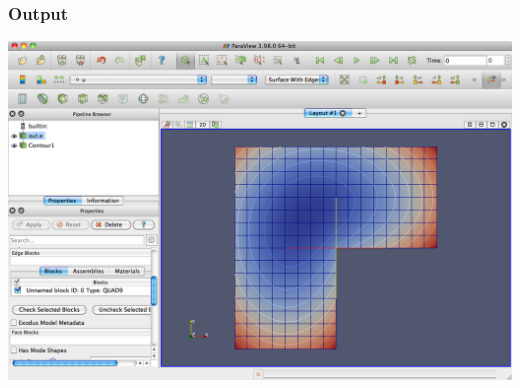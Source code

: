 \frame
{
  \frametitle{Output}
  \begin{center}
    \includegraphics[height=0.8\textheight]{tutorial/laplace_young/screen}
  \end{center}
} 
